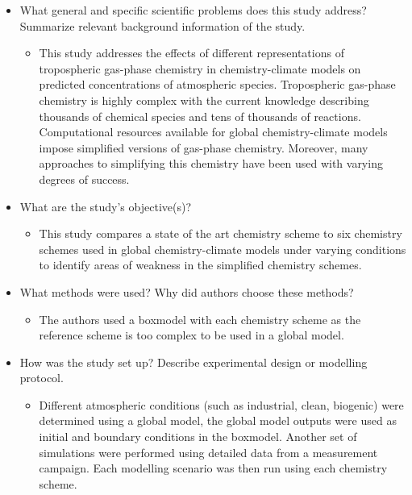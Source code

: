 \documentclass[11pt]{article}
\begin{document}
\begin{itemize}
    \item What general and specific scientific problems does this study address? Summarize relevant background information of the study. 
        \begin{itemize}
          \renewcommand\labelitemii{$\rightarrow$}
         \item This study addresses the effects of different representations of tropospheric gas-phase chemistry in chemistry-climate models on predicted concentrations of atmospheric species. \newline
            Tropospheric gas-phase chemistry is highly complex with the current knowledge describing thousands of chemical species and tens of thousands of reactions. Computational resources available for global chemistry-climate models impose simplified versions of gas-phase chemistry. Moreover, many approaches to simplifying this chemistry have been used with varying degrees of success.
        \end{itemize}

    \item What are the study's objective(s)?
        \begin{itemize}
          \renewcommand\labelitemii{$\rightarrow$}
         \item This study compares a state of the art chemistry scheme to six chemistry schemes used in global chemistry-climate models under varying conditions to identify areas of weakness in the simplified chemistry schemes.
        \end{itemize}

    \item What methods were used? Why did authors choose these methods?
        \begin{itemize}
          \renewcommand\labelitemii{$\rightarrow$}
         \item The authors used a boxmodel with each chemistry scheme as the reference scheme is too complex to be used in a global model.
        \end{itemize}

    \item How was the study set up? Describe experimental design or modelling protocol.
        \begin{itemize}
          \renewcommand\labelitemii{$\rightarrow$}
         \item Different atmospheric conditions (such as industrial, clean, biogenic) were determined using a global model, the global model outputs were used as initial and boundary conditions in the boxmodel. Another set of simulations were performed using detailed data from a measurement campaign. Each modelling scenario was then run using each chemistry scheme.
        \end{itemize}


\end{itemize}
\end{document}
